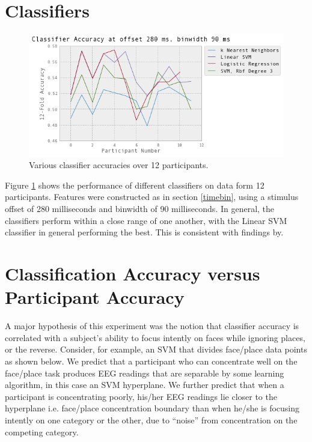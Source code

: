 \documentclass[12pt]{report}
\begin{document}
\section{Classifiers}

\begin{figure}[t]
\centerline{
\includegraphics[width=6in]{variousclassifiers}
}
\caption{Various classifier accuracies over 12 participants. \label{classifiers}}
\end{figure}

Figure \ref{classifiers} shows the performance of different classifiers on data form 12 participants.  Features were constructed as in section \ref{timebin}, using a stimulus offset of 280 milliseconds and binwidth of 90 milliseconds.  In general, the classifiers perform within a close range of one another, with the Linear SVM classifier in general performing the best.  This is consistent with findings by\cite{Lotte}.

\section{Classification Accuracy versus Participant Accuracy}

	A major hypothesis of this experiment was the notion that classifier accuracy is correlated with a subject's ability to focus intently on faces while ignoring places, or the reverse.  Consider, for example, an SVM that divides face/place data points as shown below.  We predict that a participant who can concentrate well on the face/place task produces EEG readings that are separable by some learning algorithm, in this case an SVM hyperplane.  We further predict that when a participant is concentrating poorly, his/her EEG readings lie closer to the hyperplane i.e. face/place concentration boundary than when he/she is focusing intently on one category or the other, due to ``noise'' from concentration on the competing category. 
\end{document}
